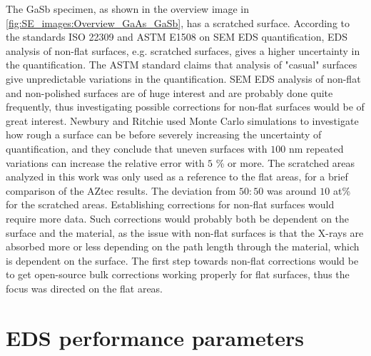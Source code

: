 


The GaSb specimen, as shown in the overview image in \cref{fig:SE_images:Overview_GaAs_GaSb}, has a scratched surface.
According to the standards ISO 22309 \cite{iso_quantification_22309} and ASTM E1508 \cite{astm_e1508_eds_quantification} on SEM EDS quantification, EDS analysis of non-flat surfaces, e.g. scratched surfaces, gives a higher uncertainty in the quantification.
The ASTM standard claims that analysis of "casual" surfaces give unpredictable variations in the quantification.
SEM EDS analysis of non-flat and non-polished surfaces are of huge interest and are probably done quite frequently, thus investigating possible corrections for non-flat surfaces would be of great interest.
Newbury and Ritchie \cite{newbury_ritchie_2013_flatness} used Monte Carlo simulations to investigate how rough a surface can be before severely increasing the uncertainty of quantification, and they conclude that uneven surfaces with $100$ nm repeated variations can increase the relative error with $5$ \% or more.
The scratched areas analyzed in this work was only used as a reference to the flat areas, for a brief comparison of the AZtec results.
The deviation from $50:50$ was around $10$ at\% for the scratched areas.
Establishing corrections for non-flat surfaces would require more data.
Such corrections would probably both be dependent on the surface and the material, as the issue with non-flat surfaces is that the X-rays are absorbed more or less depending on the path length through the material, which is dependent on the surface.
The first step towards non-flat corrections would be to get open-source bulk corrections working properly for flat surfaces, thus the focus was directed on the flat areas.









\section{EDS performance parameters}
\label{discussion:performance}

